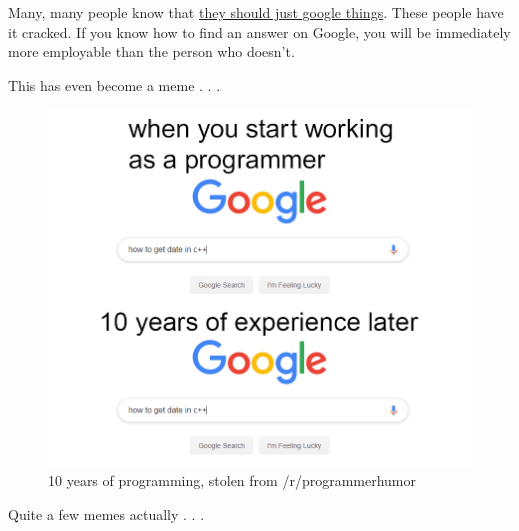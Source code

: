 \documentclass[
]{book}
\begin{document}
Many, many people know that \href{https://dev.to/dvddpl/am-i-an-expert-developer-or-just-an-expert-googler-4390}{they should just google things}. These people have it cracked. If you know how to find an answer on Google, you will be immediately more employable than the person who doesn't.

This has even become a meme . . .

\begin{figure}

{\centering \includegraphics[width=11.86in]{images/08_troubleshooting/meme1} 

}

\caption{10 years of programming, stolen from /r/programmerhumor}\label{fig:unnamed-chunk-139}
\end{figure}

Quite a few memes actually . . .
\end{document}
